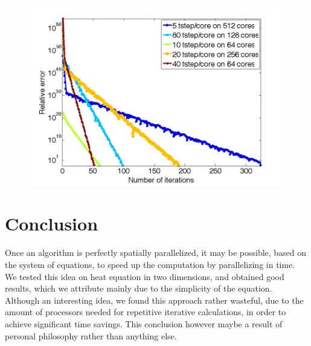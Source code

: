 \documentclass{article}
\begin{document}
\begin{figure}
      \begin{center}
	      \includegraphics[width=16cm]{convergence}
      \end{center}
\caption{}
\label{fig:conv}
\end{figure}  


\section{Conclusion}
\label{sec:concl}

Once an algorithm is perfectly spatially parallelized, it may be possible, based on the system of equations, to speed up the computation by parallelizing in time. We tested this idea on heat equation in two dimensions, and obtained good results, which we attribute mainly due to the simplicity of the equation. Although an interesting idea, we found this approach rather wasteful, due to the amount of processors needed for repetitive iterative calculations, in order to achieve significant time savings. This conclusion however maybe a result of personal philosophy rather than anything else.






\end{document}
